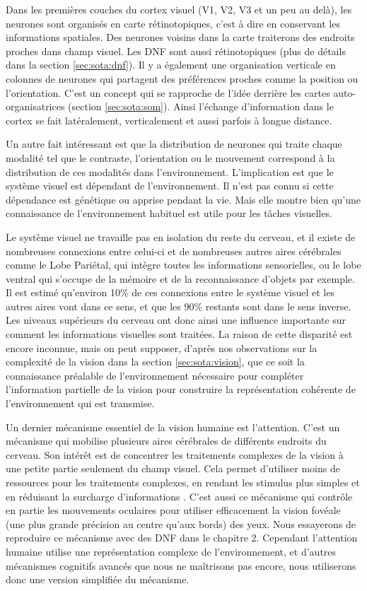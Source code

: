 	Dans les premières couches du cortex visuel (V1, V2, V3 et un peu au delà), les neurones sont organisés en carte rétinotopiques, c'est à dire en conservant les informations spatiales. Des neurones voisins dans la carte traiterons des endroits proches dans champ visuel. Les DNF sont aussi rétinotopiques (plus de détails dans la section \ref{sec:sota:dnf}). Il y a également une organisation verticale en colonnes de neurones qui partagent des préférences proches comme la position ou l'orientation. C'est un concept qui se rapproche de l'idée derrière les cartes auto-organisatrices (section \ref{sec:sota:som}). Ainsi l'échange d'information dans le cortex se fait latéralement, verticalement et aussi parfois à longue distance.

	Un autre fait intéressant est que la distribution de neurones qui traite chaque modalité tel que le contraste, l'orientation ou le mouvement correspond à la distribution de ces modalités dans l'environnement. L'implication est que le système visuel est dépendant de l'environnement. Il n'est pas connu si cette dépendance est génétique ou apprise pendant la vie. Mais elle montre bien qu'une connaissance de l'environnement habituel est utile pour les tâches visuelles.

	Le système visuel ne travaille pas en isolation du reste du cerveau, et il existe de nombreuses connexions entre celui-ci et de nombreuses autres aires cérébrales comme le Lobe Pariétal, qui intègre toutes les informations sensorielles, ou le lobe ventral qui s'occupe de la mémoire et de la reconnaissance d'objets par exemple. Il est estimé qu'environ 10\% de ces connexions entre le système visuel et les autres aires vont dans ce sens, et que les 90\% restants sont dans le sens inverse. Les niveaux supérieurs du cerveau ont donc ainsi une influence importante sur comment les informations visuelles sont traitées. La raison de cette disparité est encore inconnue, mais on peut supposer, d'après nos observations sur la complexité de la vision dans la section \ref{sec:sota:vision}, que ce soit la connaissance préalable de l'environnement nécessaire pour compléter l'information partielle de la vision pour construire la représentation cohérente de l'environnement qui est transmise.

	Un dernier mécanisme essentiel de la vision humaine est l'attention. C'est un mécanisme qui mobilise plusieurs aires cérébrales de différents endroits du cerveau. Son intérêt est de concentrer les traitements complexes de la vision à une petite partie seulement du champ visuel. Cela permet d'utiliser moins de ressources pour les traitements complexes, en rendant les stimulus plus simples et en réduisant la surcharge d'informations \cite{evans2011visual}. C'est aussi ce mécanisme qui contrôle en partie les mouvements oculaires pour utiliser efficacement la vision fovéale (une plus grande précision au centre qu'aux bords) des yeux. Nous essayerons de reproduire ce mécanisme avec des DNF dans le chapitre 2. Cependant l'attention humaine utilise une représentation complexe de l'environnement, et d'autres mécanismes cognitifs avancés que nous ne maîtrisons pas encore, nous utiliserons donc une version simplifiée du mécanisme.
	
